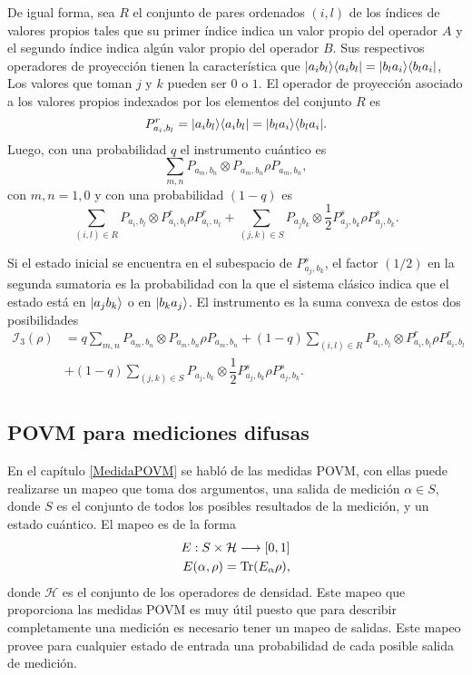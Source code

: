 De igual forma, sea $R$ el conjunto de pares ordenados $(i,l)$ de los índices de valores propios tales que su primer índice indica un valor propio del operador $A$ y el segundo índice indica algún valor propio del operador $B$. Sus respectivos operadores de proyección tienen la característica que  $|a_i b_l\rangle \langle a_i b_l|=|b_l a_i \rangle \langle b_l a_i |$, Los valores que toman $j$ y $k$ pueden ser $0$ o $1$. El operador de proyección asociado a los valores propios indexados por los elementos del conjunto $R$ es \[P^r_{a_i,b_l}=|a_i b_l\rangle \langle a_i b_l|=|b_l a_i \rangle \langle b_l a_i |.\] Luego, con una probabilidad $q$ el instrumento cuántico es \[\sum_{m,n} P_{a_m,b_n}\otimes P_{a_m,b_n}\rho P_{a_m,b_n},\] con $m,n=1,0$ y con una probabilidad $(1-q)$ es \[\sum_{(i,l)\in R} P_{a_i, b_l}\otimes  P^{r}_{a_i,b_l}\rho P^r_{a_i,n_l}+\sum_{(j,k)\in S}P_{a_j b_k} \otimes  \dfrac{1}{2}P^{s}_{a_j,b_k}\rho P^s_{a_j,b_k}.\]

Si el estado inicial se encuentra en el subespacio de $P^{s}_{a_j,b_k}$, el factor $(1/2)$ en la segunda sumatoria es la probabilidad con la que el sistema clásico indica  que el estado está en $|a_j b_k\rangle $ o en $|b_k a_j\rangle$. El instrumento es la suma convexa de estos dos posibilidades \begin{equation}
    \begin{split}
        \mathcal{I}_3(\rho)&=q\sum_{m,n}  P_{a_m,b_n}\otimes P_{a_m,b_n}\rho P_{a_m,b_n} +(1-q)\sum_{(i,l)\in R} P_{a_i, b_l}\otimes  P^{r}_{a_i,b_l}\rho P^r_{a_i,b_l}\\
        &+(1-q)\sum_{(j,k)\in S}P_{a_j,b_k} \otimes  \dfrac{1}{2}P^{s}_{a_j,b_k}\rho P^s_{a_j,b_k}.\\
    \end{split}
\end{equation}  

\subsection{POVM para mediciones difusas}\label{Sec_POVM_para_mediciones_difusas}

En el capítulo {\ref{MedidaPOVM}} se habló de las medidas POVM, con ellas puede realizarse un mapeo que toma dos argumentos, una salida de medición $\alpha \in S $, donde $S$ es el conjunto de todos los posibles resultados de la medición, y un estado cuántico. El mapeo es de la forma \begin{equation}\begin{split}
    E:S\times \mathcal{H}\longrightarrow [0,1]\\
    E(\alpha,\rho)={\rm Tr}(E_\alpha\rho),
\end{split}\end{equation}
donde $\mathcal{H}$ es el conjunto de los operadores de densidad. Este mapeo que proporciona las medidas POVM es muy útil puesto que para describir completamente una medición es necesario tener un mapeo de salidas. Este mapeo provee para cualquier estado de entrada una probabilidad de cada posible salida de medición. 


